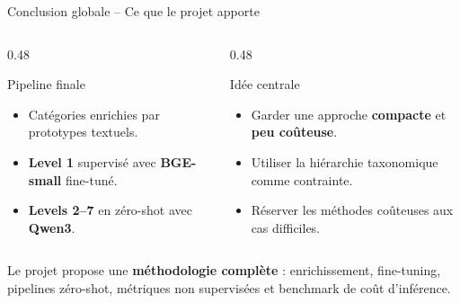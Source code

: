 \documentclass[11pt,aspectratio=169]{beamer}
\begin{document}
\begin{frame}{Conclusion globale -- Ce que le projet apporte}
\small
\begin{columns}
\begin{column}{0.48\textwidth}
\begin{block}{Pipeline finale}
\begin{itemize}
    \item Catégories enrichies par prototypes textuels.
    \item \textbf{Level 1} supervisé avec \textbf{BGE-small} fine-tuné.
    \item \textbf{Levels 2--7} en zéro-shot avec \textbf{Qwen3}.
\end{itemize}
\end{block}
\end{column}

\begin{column}{0.48\textwidth}
\begin{block}{Idée centrale}
\begin{itemize}
    \item Garder une approche \textbf{compacte} et \textbf{peu coûteuse}.
    \item Utiliser la hiérarchie taxonomique comme contrainte.
    \item Réserver les méthodes coûteuses aux cas difficiles.
\end{itemize}
\end{block}
\end{column}
\end{columns}

\vspace{0.3cm}

\begin{takeawaybox}
\centering
Le projet propose une \textbf{méthodologie complète} : enrichissement, fine-tuning, pipelines zéro-shot, métriques non supervisées et benchmark de coût d'inférence.
\end{takeawaybox}
\end{frame}
\end{document}
